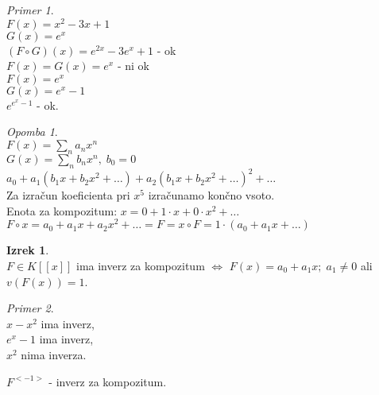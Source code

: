\documentclass[a4paper, 12pt]{book}
\theoremstyle{definition}
\newtheorem{theorem}[counter]{Izrek}
\theoremstyle{remark}
\newtheorem*{ex}{Primer}
\newtheorem*{rem}{Opomba}
\begin{document}
\begin{ex} \text{} \\
  $F(x) = x^2 - 3x + 1$ \\
  $G(x) = e^x$ \\
  $(F \circ G)(x) = e^{2x} - 3e^x + 1$ - ok \\
  $F(x) = G(x) = e^x$ - ni ok \\
  $F(x) = e^x$ \\
  $G(x) = e^x - 1$ \\
  $e^{e^x-1}$ - ok.
\end{ex}
\begin{rem} \text{} \\
  $F(x) = \sum_n a_n x^n$ \\
  $G(x) = \sum_n b_n x^n, \; b_0 = 0$ \\
  $a_0 + a_1(b_1 x + b_2 x^2 + \dots) + a_2(b_1 x + b_2 x^2 + \dots)^2 + \dots$ \\
  Za izračun koeficienta pri $x^5$ izračunamo končno vsoto. \\
  Enota za kompozitum: $x = 0 + 1 \cdot x + 0 \cdot x^2 + \dots$ \\
  $F \circ x = a_0 + a_1 x + a_2 x^2 + \dots = F = x \circ F = 1 \cdot (a_0 + a_1 x + \dots)$
\end{rem}
\begin{theorem} \text{} \\
  $F \in K[[x]]$ ima inverz za kompozitum $\iff$ $F(x) = a_0 + a_1 x; \; a_1 \neq 0$ ali $v(F(x)) = 1$.
\end{theorem}
\begin{ex} \text{} \\
  $x - x^2$ ima inverz, \\
  $e^x - 1$ ima inverz, \\
  $x^2$ nima inverza.
\end{ex}
$F^{<-1>}$ - inverz za kompozitum.
\end{document}

